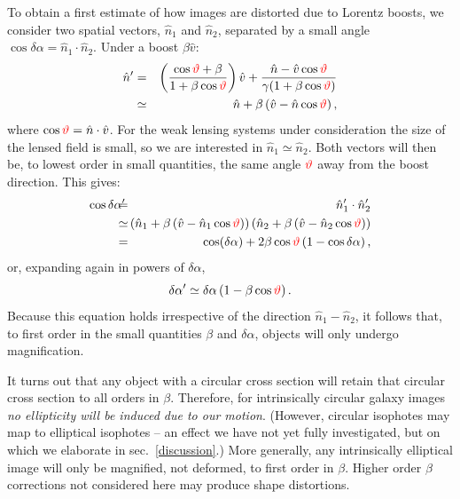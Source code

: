 \documentclass[useAMS,fleqn,usenatbib]{mn2e}
\begin{document}
To obtain a first estimate of how images are distorted due to Lorentz boosts, we 
consider two spatial vectors, $\hat{n}_1$ and $\hat{n}_2$, separated by a small 
angle $\cos\delta\alpha = \hat{n}_1\cdot\hat{n}_2$. Under a boost $\beta \hat{v}$:
\begin{eqnarray}
    \hat{n}' & = &
    \left( \frac{\cos{\color{red}\vartheta}+\beta}{1+\beta \cos{\color{red}\vartheta}} \right) \hat{v}
    + \frac{\hat{n}-\hat{v}\cos{\color{red}\vartheta}}{\gamma(1+\beta\cos{\color{red}\vartheta})} \\
    & \simeq & \hat{n} + \beta \left( \hat{v} - \hat{n}\cos{\color{red}\vartheta} \right),
\end{eqnarray}
where $\cos{\color{red}\vartheta} = \hat{n}\cdot\hat{v}$.  For the weak lensing systems under consideration
the size of the lensed field is small, so we are interested in  $\hat{n}_1 \simeq \hat{n}_2$.
Both vectors will then be, to lowest order in small quantities, 
the same angle ${\color{red}\vartheta}$ away from the boost direction. 
This gives:
\begin{eqnarray}
    \cos\delta\alpha'& \!\!\!\!\!=\!\!\!\!\! & \hat{n}_1'\cdot\hat{n}_2' \\
    &\!\!\!\!\! \simeq \!\!\!\!\!& \left( \hat{n}_1 + \beta \left( \hat{v} - \hat{n}_1\cos{\color{red}\vartheta} \right) \right)
    \left( \hat{n}_2 + \beta \left( \hat{v} - \hat{n}_2\cos{\color{red}\vartheta} \right) \right) \\
    &\!\!\!\!\! =\!\!\!\!\! & \cos(\delta\alpha) + 2\beta\cos{\color{red}\vartheta}\left( 1-\cos\delta\alpha \right),
\end{eqnarray}
or, expanding again in powers of $\delta\alpha$,
\begin{equation}
    \delta\alpha' \simeq \delta\alpha \left( 1 - \beta\cos{\color{red}\vartheta} \right).
\end{equation}
Because this equation holds irrespective of the direction $\hat{n}_1-\hat{n}_2$, it follows that,
to first order in the small quantities $\beta$ and $\delta\alpha$,
objects will only undergo magnification.


{\color{red}It turns out that any} object with a circular cross section
will retain that circular cross section to all orders in $\beta$.
Therefore, for intrinsically circular galaxy images  {\it{no ellipticity will 
be induced due to our motion}}.
(However, circular isophotes may map to elliptical isophotes -- an effect
we have not yet fully investigated, but on which we elaborate in sec.~\ref{discussion}.)
More generally,  any intrinsically elliptical image will only be magnified, 
not deformed, to first order in $\beta$. Higher order
$\beta$ corrections not considered here may produce shape 
distortions. 
\end{document}
